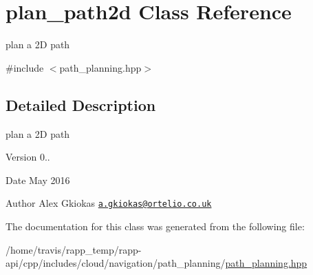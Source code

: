\hypertarget{classplan__path2d}{\section{plan\-\_\-path2d Class Reference}
\label{classplan__path2d}
}


plan a 2\-D path  




{\ttfamily \#include $<$path\-\_\-planning.\-hpp$>$}



\subsection{Detailed Description}
plan a 2\-D path 

\begin{DoxyVersion}{Version}
0.. 
\end{DoxyVersion}
\begin{DoxyDate}{Date}
May 2016 
\end{DoxyDate}
\begin{DoxyAuthor}{Author}
Alex Gkiokas \href{mailto:a.gkiokas@ortelio.co.uk}{\tt a.\-gkiokas@ortelio.\-co.\-uk} 
\end{DoxyAuthor}


The documentation for this class was generated from the following file\-:\begin{DoxyCompactItemize}
\item 
/home/travis/rapp\-\_\-temp/rapp-\/api/cpp/includes/cloud/navigation/path\-\_\-planning/\hyperlink{path__planning_8hpp}{path\-\_\-planning.\-hpp}\end{DoxyCompactItemize}
